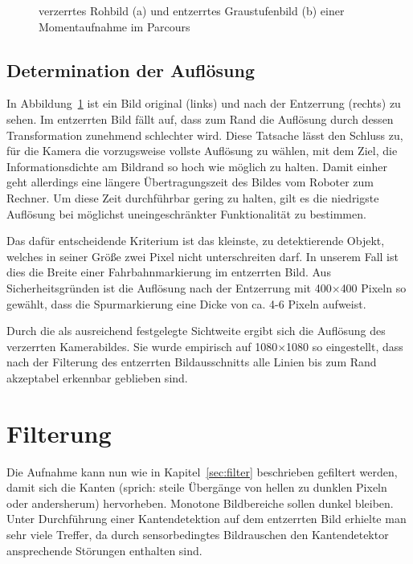 \begin{figure}[htbp] %
  \centering
  \qquad
  \caption{verzerrtes Rohbild (a) und entzerrtes Graustufenbild (b) einer Momentaufnahme im Parcours}
\label{fig:bildvorverarbeitung_entzerren}
\end{figure} 

\subsection{Determination der Auflösung}
In Abbildung~\ref{fig:bildvorverarbeitung_entzerren} ist ein Bild original (links) und nach der Entzerrung (rechts) zu sehen. Im entzerrten Bild fällt auf, dass zum Rand die Auflösung durch dessen Transformation zunehmend schlechter wird. Diese Tatsache lässt den Schluss zu, für die Kamera die vorzugsweise vollste Auflösung zu wählen, mit dem Ziel, die Informationsdichte am Bildrand so hoch wie möglich zu halten. Damit einher geht allerdings eine längere Übertragungszeit des Bildes vom Roboter zum Rechner. Um diese Zeit durchführbar gering zu halten, gilt es die niedrigste Auflösung bei möglichst uneingeschränkter Funktionalität zu bestimmen. 

Das dafür entscheidende Kriterium ist das kleinste, zu detektierende Objekt, welches in seiner Größe zwei Pixel nicht unterschreiten darf. In unserem Fall ist dies die Breite einer Fahrbahnmarkierung im entzerrten Bild. Aus Sicherheitsgründen ist die Auflösung nach der Entzerrung mit 400\( \times \)400 Pixeln so gewählt, dass die Spurmarkierung eine Dicke von ca. 4-6 Pixeln aufweist. 

Durch die als ausreichend festgelegte Sichtweite ergibt sich die Auflösung des verzerrten Kamerabildes. Sie wurde empirisch auf 1080\( \times \)1080 so eingestellt, dass nach der Filterung des entzerrten Bildausschnitts alle Linien bis zum Rand akzeptabel erkennbar geblieben sind.

\section{Filterung}
\label{sec:bildvorverarbeitung:filterung}
Die Aufnahme kann nun wie in Kapitel~\ref{sec:filter} beschrieben gefiltert werden, damit sich die Kanten (sprich: steile Übergänge von hellen zu dunklen Pixeln oder andersherum) hervorheben. Monotone Bildbereiche sollen dunkel bleiben. Unter Durchführung einer Kantendetektion auf dem entzerrten Bild erhielte man sehr viele Treffer, da durch sensorbedingtes Bildrauschen den Kantendetektor ansprechende Störungen enthalten sind. 

